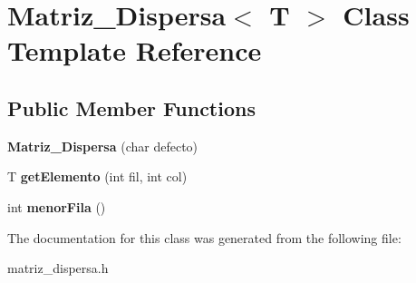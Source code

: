 \hypertarget{classMatriz__Dispersa}{}\section{Matriz\+\_\+\+Dispersa$<$ T $>$ Class Template Reference}
\label{classMatriz__Dispersa}
\subsection*{Public Member Functions}
\begin{DoxyCompactItemize}
\item 
{\bfseries Matriz\+\_\+\+Dispersa} (char defecto)\hypertarget{classMatriz__Dispersa_a426e594828f386673ca95fc682f67677}{}\label{classMatriz__Dispersa_a426e594828f386673ca95fc682f67677}

\item 
T {\bfseries get\+Elemento} (int fil, int col)\hypertarget{classMatriz__Dispersa_a3317cc1e47591f70a043543af7c1db7c}{}\label{classMatriz__Dispersa_a3317cc1e47591f70a043543af7c1db7c}

\item 
int {\bfseries menor\+Fila} ()\hypertarget{classMatriz__Dispersa_a6b02135aec60533c03816622453d7aeb}{}\label{classMatriz__Dispersa_a6b02135aec60533c03816622453d7aeb}

\end{DoxyCompactItemize}


The documentation for this class was generated from the following file\+:\begin{DoxyCompactItemize}
\item 
matriz\+\_\+dispersa.\+h\end{DoxyCompactItemize}
